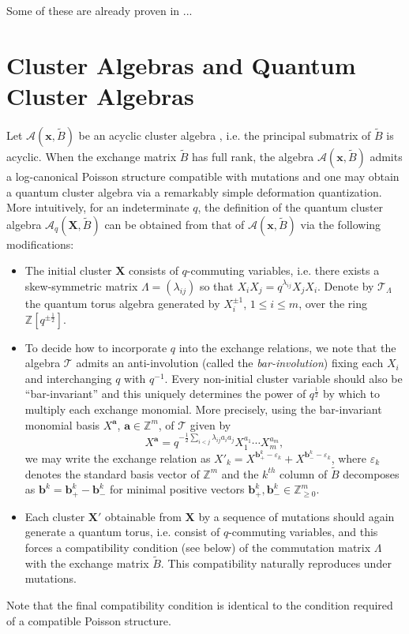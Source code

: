 \documentclass{amsart}
\newcommand{\bfa}{\mathbf{a}}
\newcommand{\bfb}{\mathbf{b}}
\newcommand{\bfx}{\mathbf{x}}
\newcommand{\bfX}{\mathbf{X}}
\newcommand{\cA}{\mathcal{A}}
\newcommand{\cT}{\mathcal{T}}
\newcommand{\half}{{\frac{1}{2}}}
\newcommand{\ZZ}{\mathbb{Z}}
\begin{document}
  Some of these are already proven in \cite{demonet}...

  \section{Cluster  Algebras and Quantum Cluster Algebras} Let $\cA(\bfx,\tilde B)$ be an acyclic cluster algebra \cite{berenstein-fomin-zelevinsky}, i.e. the principal submatrix of $\tilde B$ is acyclic.  
  When the exchange matrix $\tilde B$ has full rank, the algebra $\cA(\bfx,\tilde B)$ admits a log-canonical Poisson structure compatible with mutations \cite{gekhtman-shapiro-vainshtein} and one may obtain a quantum cluster algebra via a remarkably simple deformation quantization.  
  More intuitively, for an indeterminate $q$, the definition of the quantum cluster algebra $\cA_q(\bfX,\tilde B)$ can be obtained from that of $\cA(\bfx,\tilde B)$ via the following modifications:
  \begin{itemize}
    \item The initial cluster $\bfX$ consists of $q$-commuting variables, i.e. there exists a skew-symmetric matrix $\Lambda=(\lambda_{ij})$ so that $X_iX_j=q^{\lambda_{ij}}X_jX_i$.  
    Denote by $\cT_\Lambda$ the quantum torus algebra generated by $X_i^{\pm1}$, $1\le i\le m$, over the ring $\ZZ[q^{\pm\half}]$.
    \item To decide how to incorporate $q$ into the exchange relations, we note that the algebra $\cT$ admits an anti-involution (called the \emph{bar-involution}) fixing each $X_i$ and interchanging $q$ with $q^{-1}$.
    Every non-initial cluster variable should also be ``bar-invariant'' and this uniquely determines the power of $q^\half$ by which to multiply each exchange monomial.  
    More precisely, using the bar-invariant monomial basis $X^\bfa$, $\bfa\in\ZZ^m$, of $\cT$ given by
    \[X^\bfa=q^{-\half\sum\limits_{i<j}\lambda_{ij}a_ia_j}X_1^{a_1}\cdots X_m^{a_m},\]
    we may write the exchange relation as $X'_k=X^{\bfb_+^k-\varepsilon_k}+X^{\bfb_-^k-\varepsilon_k}$, where $\varepsilon_k$ denotes the standard basis vector of $\ZZ^m$ and the $k^{th}$ column of $\tilde B$ decomposes as $\bfb^k=\bfb^k_+-\bfb^k_-$ for minimal positive vectors $\bfb^k_+,\bfb^k_-\in\ZZ_{\ge0}^m$.
    \item Each cluster $\bfX'$ obtainable from $\bfX$ by a sequence of mutations should again generate a quantum torus, i.e. consist of $q$-commuting variables, and this forces a compatibility condition (see below) of the commutation matrix $\Lambda$ with the exchange matrix $\tilde B$.
    This compatibility naturally reproduces under mutations.
  \end{itemize}
  Note that the final compatibility condition is identical to the condition required of a compatible Poisson structure.
  
\end{document}

